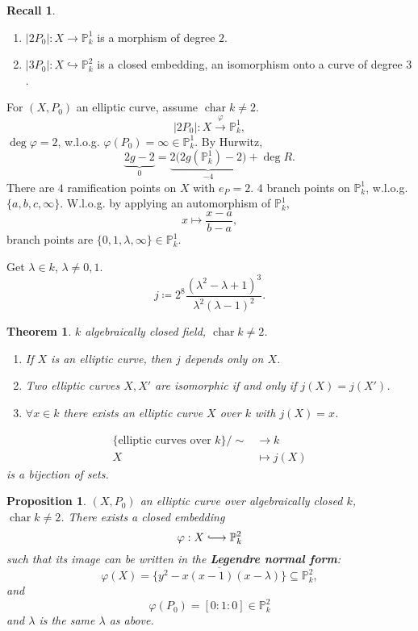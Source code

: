 \documentclass[12pt]{article}
\DeclareMathOperator{\chara}{char}
\newtheorem*{proposition}{Proposition}
\newtheorem*{theorem}{Theorem}
\theoremstyle{definition}
\newtheorem*{recall}{Recall}
\begin{document}
\begin{recall}
\begin{enumerate}[label=\arabic*)]
\item $|2P_0|:X\rightarrow\mathbb P_k^1$ is a morphism of degree $2$.

\item $|3P_0|:X\hookrightarrow\mathbb P_k^2$ is a closed embedding, an isomorphism onto a curve of degree $3$.
\end{enumerate}
\end{recall}

For $(X,P_0)$ an elliptic curve, assume $\chara k\neq2$.
\[|2P_0|:X\overset\varphi\longrightarrow\mathbb P_k^1,\]
$\deg\varphi=2$, w.l.o.g. $\varphi(P_0)=\infty\in\mathbb P_k^1$. By Hurwitz,
\[\underbrace{2g-2}_0=\underbrace{2\big(2g(\mathbb P_k^1)-2\big)}_{-4}+\deg R.\]
There are $4$ ramification points on $X$ with $e_P=2$. $4$ branch points on $\mathbb P_k^1$, w.l.o.g. $\{a,b,c,\infty\}$. W.l.o.g. by applying an automorphism of $\mathbb P_k^1$,
\[x\longmapsto\frac{x-a}{b-a},\]
branch points are $\{0,1,\lambda,\infty\}\in\mathbb P_k^1$.

Get $\lambda\in k$, $\lambda\neq0,1$.
\[j\coloneqq2^8\frac{(\lambda^2-\lambda+1)^3}{\lambda^2(\lambda-1)^2}.\]

\begin{theorem}
$k$ algebraically closed field, $\chara k\neq2$.

\begin{enumerate}[label=\arabic*)]
\item If $X$ is an elliptic curve, then $j$ depends only on $X$.

\item Two elliptic curves $X,X'$ are isomorphic if and only if $j(X)=j(X')$.

\item $\forall x\in k$ there exists an elliptic curve $X$ over $k$ with $j(X)=x$.
\end{enumerate}
\begin{align*}
\{\text{elliptic curves over }k\}\big/\sim&\longrightarrow k\\X&\longmapsto j(X)
\end{align*}
is a bijection of sets.
\end{theorem}

\begin{proposition}
$(X,P_0)$ an elliptic curve over algebraically closed $k$, $\chara k\neq2$. There exists a closed embedding
\[\varphi:X\lhook\joinrel\longrightarrow\mathbb P_k^2\]
such that its image can be written in the \textbf{Legendre normal form}:
\[\varphi(X)=\overline{\{y^2-x(x-1)(x-\lambda)\}}\subseteq\mathbb P_k^2,\]
and
\[\varphi(P_0)=[0:1:0]\in\mathbb P_k^2\]
and $\lambda$ is the same $\lambda$ as above.
\end{proposition}
\end{document}
